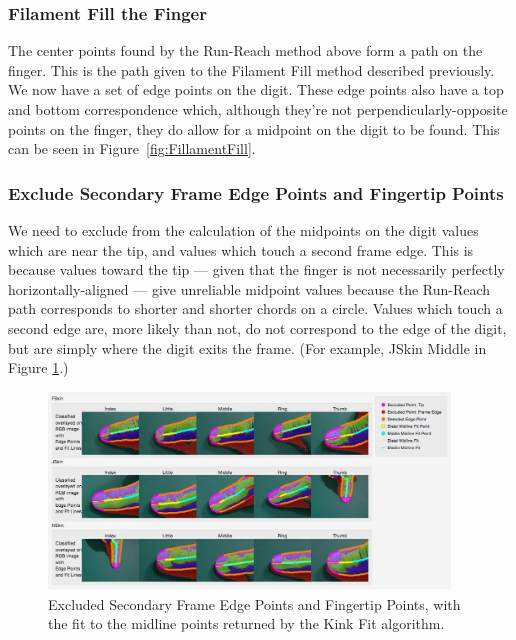 \subsubsection{Filament Fill the Finger}\label{sec:FilamentFillTheFinger}
The center points found by the Run-Reach method above form a path on the finger. This is the path given to the Filament Fill method described previously. We now have a set of edge points on the digit. These edge points also have a top and bottom correspondence which, although they're not perpendicularly-opposite points on the finger, they do allow for a midpoint on the digit to be found. This can be seen in Figure~\ref{fig:FillamentFill}.

\subsubsection{Exclude Secondary Frame Edge Points and Fingertip Points }\label{sec:ExcludeSecondaryFrameEdgePointsAndFingertipPoints}
We need to exclude from the calculation of the midpoints on the digit values which are near the tip, and values which touch a second frame edge. This is because values toward the tip --- given that the finger is not necessarily perfectly horizontally-aligned --- give unreliable midpoint values because the Run-Reach path corresponds to shorter and shorter chords on a circle. Values which touch a second edge are, more likely than not, do not correspond to the edge of the digit, but are simply where the digit exits the frame. (For example, JSkin Middle in Figure \ref{fig:ExcludedEdgePointsAndMidlineFit}.)

\begin{figure}[h!]
  \centering
    \includegraphics[width=0.95\textwidth]{Chapter4/Figs/ExcludedEdgePointsAndMidlineFit.jpg}
    \caption{Excluded Secondary Frame Edge Points and Fingertip Points, with the fit to the midline points returned by the Kink Fit algorithm.}\label{fig:ExcludedEdgePointsAndMidlineFit}
\end{figure}

